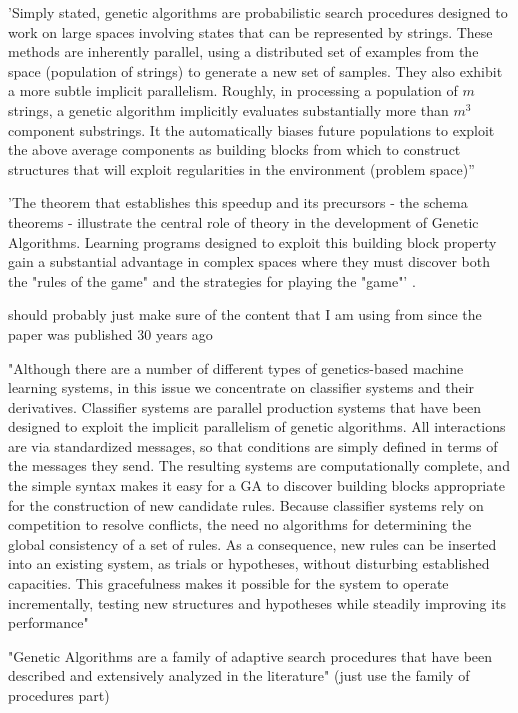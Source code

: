 'Simply stated, genetic algorithms are probabilistic search procedures designed to work on large spaces involving states that can be represented by strings. These methods are inherently parallel, using a distributed set of examples from the space (population of strings) to generate a new set of samples. They also exhibit a more subtle implicit parallelism. Roughly, in processing a population of $m$ strings, a genetic algorithm implicitly evaluates substantially more than $m^3$ component substrings. It the automatically biases future populations to exploit the above average components as building blocks from which to construct structures that will exploit regularities in the environment (problem space)'' \cite{goldberg1988genetic}

'The theorem that establishes this speedup and its precursors - the schema theorems - illustrate the central role of theory in the development of Genetic Algorithms. Learning programs designed to exploit this building block property gain a substantial advantage in complex spaces where they must discover both the "rules of the game" and the strategies for playing the "game"' \cite{goldberg1988genetic}.

should probably just make sure of the content that I am using from \cite{goldberg1988genetic} since the paper was published 30 years ago

"Although there are a number of different types of genetics-based machine learning systems, in this issue we concentrate on classifier systems and their derivatives. Classifier systems are parallel production systems that have been designed to exploit the implicit parallelism of genetic algorithms. All interactions are via standardized messages, so that conditions are simply defined in terms of the messages they send. The resulting systems are computationally complete, and the simple syntax makes it easy for a GA to discover building blocks appropriate for the construction of new candidate rules. Because classifier systems rely on competition to resolve conflicts, the need no algorithms for determining the global consistency of a set of rules. As a consequence, new rules can be inserted into an existing system, as trials or hypotheses, without disturbing established capacities. This gracefulness makes it possible for the system to operate incrementally, testing new structures and hypotheses while steadily improving its performance"


"Genetic Algorithms are a family of adaptive search procedures that have been described and extensively analyzed in the literature" \cite{de1988learning} (just use the family of procedures part)

